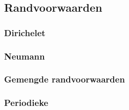 \subsection{Randvoorwaarden}
\subsubsection{Dirichelet}
\subsubsection{Neumann}
\subsubsection{Gemengde randvoorwaarden} %
\subsubsection{Periodieke}